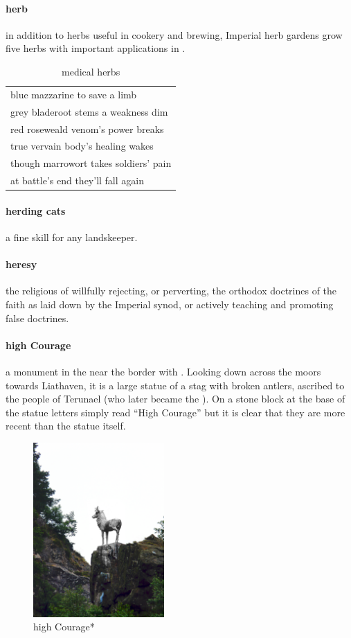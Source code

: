\paragraph{herb} in addition to herbs useful in cookery and brewing, Imperial herb gardens grow five herbs with important applications in . \begin{table} \begin{tabular}{p{}} blue mazzarine to save a limb\\ grey bladeroot stems a weakness dim\\ red roseweald venom’s power breaks\\ true vervain body's healing wakes\\ though marrowort takes soldiers' pain\\ at battle's end they'll fall again\\ \end{tabular}\caption{medical herbs}\end{table}
\paragraph{herding cats} a fine skill for any landskeeper.
\paragraph{heresy} the religious  of willfully rejecting, or perverting, the orthodox doctrines of the faith as laid down by the Imperial synod, or actively teaching and promoting false doctrines.
\paragraph{high Courage} a monument in the  near the border with . Looking down across the moors towards Liathaven, it is a large statue of a stag with broken antlers, ascribed to the people of Terunael (who later became the ). On a stone block at the base of the statue letters simply read “High Courage” but it is clear that they are more recent than the statue itself. \begin{figure}\centering\includegraphics[width=5cm]{encyclopedia/highcourage}\caption{high Courage*}\end{figure}

